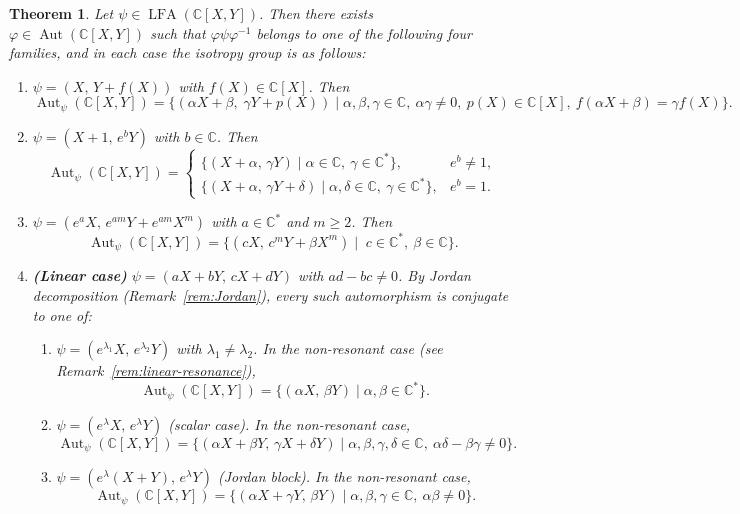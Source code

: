 \documentclass[11pt,a4paper,reqno]{amsart}
\newtheorem{theorem}{Theorem}[section]
\newcommand{\Aut}[0]{\ensuremath{\operatorname{Aut}}}
\begin{document}
\begin{theorem}\label{th:IsotropyLFA}
Let $\psi \in \operatorname{LFA}(\mathbb{C}[X,Y])$. Then there exists 
$\varphi \in \operatorname{Aut}(\mathbb{C}[X,Y])$ such that 
$\varphi \psi \varphi^{-1}$ belongs to one of the following four families, 
and in each case the isotropy group is as follows:
\begin{enumerate}
    \item 
    $\psi = (X,\, Y+f(X))$ with $f(X)\in \mathbb{C}[X]$. Then
    \[
    \Aut_{\psi}(\mathbb{C}[X,Y])
    = \{(\alpha X + \beta ,\;  \gamma Y + p(X)) \mid \alpha,\beta,\gamma \in \mathbb{C},\ \alpha\gamma \neq 0,\ p(X)\in \mathbb{C}[X],\ f(\alpha X+\beta)=\gamma f(X)\}.
    \]
 
    \item
    $\psi=(X+1,\,e^bY)$ with $b\in \mathbb{C}$. Then
    \[
    \Aut_\psi(\mathbb{C}[X,Y]) 
    =
    \begin{cases}
    \{ (X+\alpha,\, \gamma Y) \mid \alpha\in \mathbb{C},\ \gamma\in \mathbb{C}^* \}, & e^b\neq 1,\\[2mm]
    \{ (X+\alpha,\, \gamma Y+\delta) \mid \alpha,\delta\in \mathbb{C},\ \gamma\in \mathbb{C}^* \}, & e^b=1.
    \end{cases}
    \]
 
    \item 
    $\psi=(e^aX,\, e^{am}Y+e^{am}X^m)$ with $a\in \mathbb{C}^*$ and $m\geq 2$. Then
    \[
    \Aut_{\psi}(\mathbb{C}[X,Y]) 
    = \{ (c X,\, c^{m} Y+\beta X^{m}) \mid \; c\in \mathbb{C}^*,\ \beta\in \mathbb{C} \}.
    \]
 
    \item 
    \textbf{(Linear case)} $\psi=(aX+bY,\,cX+dY)$ with $ad-bc\neq 0$.  
    By Jordan decomposition (Remark~\ref{rem:Jordan}), every such automorphism is conjugate to one of:
    \begin{enumerate}
        \item $\psi=(e^{\lambda_1}X,\, e^{\lambda_2}Y)$ with $\lambda_1\neq \lambda_2$. 
        In the non-resonant case (see Remark~\ref{rem:linear-resonance}),
        \[
        \Aut_{\psi}(\mathbb{C}[X,Y])=\{(\alpha X,\, \beta Y) \mid \alpha,\beta\in \mathbb{C}^*\}.
        \]
 
        \item $\psi=(e^\lambda X,\, e^\lambda Y)$ (scalar case). In the non-resonant case,
        \[
        \Aut_\psi(\mathbb{C}[X,Y])
        = \{ (\alpha X+\beta Y,\, \gamma X+\delta Y) \mid \alpha,\beta,\gamma,\delta\in \mathbb{C},\ \alpha\delta-\beta\gamma\neq 0\}.
        \]
 
        \item $\psi=(e^\lambda(X+Y),\, e^\lambda Y)$ (Jordan block). In the non-resonant case,
        \[
        \Aut_\psi(\mathbb{C}[X,Y]) 
        = \{(\alpha X+\gamma Y,\, \beta Y) \mid \alpha,\beta,\gamma\in \mathbb{C},\ \alpha\beta\neq 0\}.
        \]
    \end{enumerate}
\end{enumerate}
\end{theorem}
 
\end{document}
